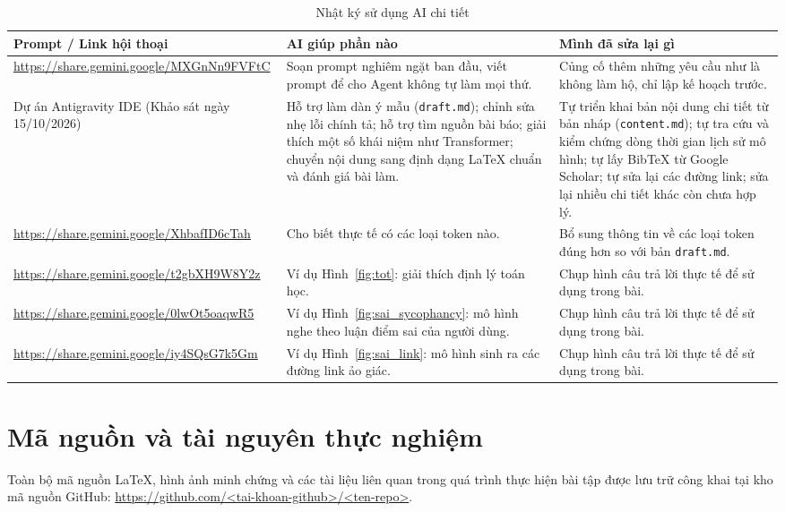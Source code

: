 \documentclass[12pt,a4paper]{article}
\begin{document}
\begin{table}[H]
  \centering
  \caption{Nhật ký sử dụng AI chi tiết}
  \label{tab:nhatky}
  \begin{tabular}{p{3.6cm}p{5.2cm}p{5.8cm}}
    \toprule
    Prompt / Link hội thoại & AI giúp phần nào & Mình đã sửa lại gì \\
    \midrule
    \url{https://share.gemini.google/MXGnNn9FVFtC} & Soạn prompt nghiêm ngặt ban đầu, viết prompt để cho Agent không tự làm mọi thứ. & Củng cố thêm những yêu cầu như là không làm hộ, chỉ lập kế hoạch trước. \\
    \midrule
    Dự án Antigravity IDE (Khảo sát ngày 15/10/2026) & Hỗ trợ làm dàn ý mẫu (\texttt{draft.md}); chỉnh sửa nhẹ lỗi chính tả; hỗ trợ tìm nguồn bài báo; giải thích một số khái niệm như Transformer; chuyển nội dung sang định dạng \LaTeX{} chuẩn và đánh giá bài làm. & Tự triển khai bản nội dung chi tiết từ bản nháp (\texttt{content.md}); tự tra cứu và kiểm chứng dòng thời gian lịch sử mô hình; tự lấy BibTeX từ Google Scholar; tự sửa lại các đường link; sửa lại nhiều chi tiết khác còn chưa hợp lý. \\
    \midrule
    \url{https://share.gemini.google/XhbafID6cTah} & Cho biết thực tế có các loại token nào. & Bổ sung thông tin về các loại token đúng hơn so với bản \texttt{draft.md}. \\
    \midrule
    \url{https://share.gemini.google/t2gbXH9W8Y2z} & Ví dụ Hình~\ref{fig:tot}: giải thích định lý toán học. & Chụp hình câu trả lời thực tế để sử dụng trong bài. \\
    \midrule
    \url{https://share.gemini.google/0lwOt5oaqwR5} & Ví dụ Hình~\ref{fig:sai_sycophancy}: mô hình nghe theo luận điểm sai của người dùng. & Chụp hình câu trả lời thực tế để sử dụng trong bài. \\
    \midrule
    \url{https://share.gemini.google/iy4SQsG7k5Gm} & Ví dụ Hình~\ref{fig:sai_link}: mô hình sinh ra các đường link ảo giác. & Chụp hình câu trả lời thực tế để sử dụng trong bài. \\
    \bottomrule
  \end{tabular}
\end{table}

\section{Mã nguồn và tài nguyên thực nghiệm}
Toàn bộ mã nguồn \LaTeX{}, hình ảnh minh chứng và các tài liệu liên quan trong quá trình thực hiện bài tập được lưu trữ công khai tại kho mã nguồn GitHub: \url{https://github.com/<tai-khoan-github>/<ten-repo>}.
\end{document}

